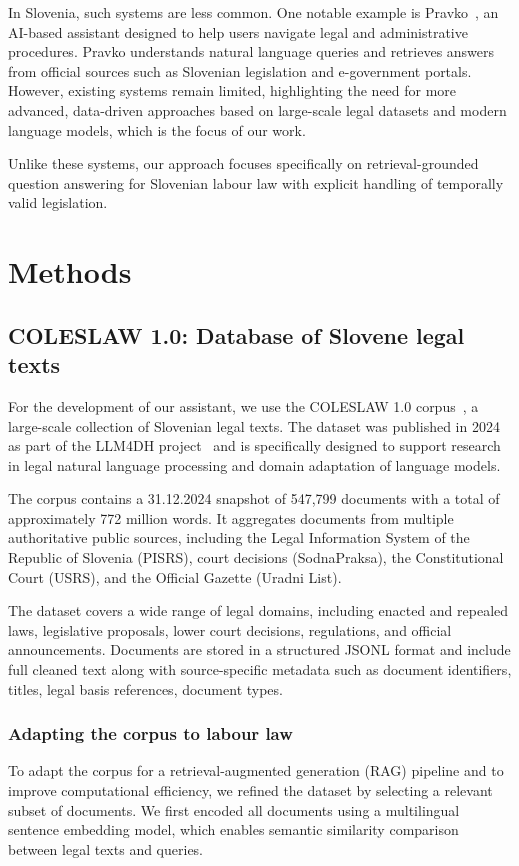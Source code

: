 \documentclass[fleqn,moreauthors,10pt]{ds_report}
\begin{document}
In Slovenia, such systems are less common. One notable example is Pravko~\cite{pravko}, an AI-based assistant designed to help users navigate legal and administrative procedures. Pravko understands natural language queries and retrieves answers from official sources such as Slovenian legislation and e-government portals. However, existing systems remain limited, highlighting the need for more advanced, data-driven approaches based on large-scale legal datasets and modern language models, which is the focus of our work.

Unlike these systems, our approach focuses specifically on retrieval-grounded question answering for Slovenian labour law with explicit handling of temporally valid legislation.

\section*{Methods}
\subsection*{COLESLAW 1.0: Database of Slovene legal texts}
For the development of our assistant, we use the COLESLAW 1.0 corpus~\cite{coleslaw}, a large-scale collection of Slovenian legal texts. The dataset was published in 2024 as part of the LLM4DH project~\cite{llm4dh} and is specifically designed to support research in legal natural language processing and domain adaptation of language models.

The corpus contains a 31.12.2024 snapshot of 547,799 documents with a total of approximately 772 million words. It aggregates documents from multiple authoritative public sources, including the Legal Information System of the Republic of Slovenia (PISRS), court decisions (SodnaPraksa), the Constitutional Court (USRS), and the Official Gazette (Uradni List).

The dataset covers a wide range of legal domains, including enacted and repealed laws, legislative proposals, lower court decisions, regulations, and official announcements. Documents are stored in a structured JSONL format and include full cleaned text along with source-specific metadata such as document identifiers, titles, legal basis references, document types.

\subsubsection*{Adapting the corpus to labour law}
To adapt the corpus for a retrieval-augmented generation (RAG) pipeline and to improve computational efficiency, we refined the dataset by selecting a relevant subset of documents. We first encoded all documents using a multilingual sentence embedding model, which enables semantic similarity comparison between legal texts and queries.
\end{document}
